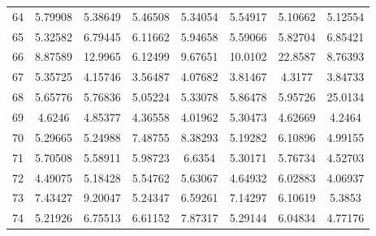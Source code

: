 \begin{center}
\begin{longtable}{cccccccc}
64 & 5.79908 & 5.38649 & 5.46508 & 5.34054 & 5.54917 & 5.10662 & 5.12554\\
65 & 5.32582 & 6.79445 & 6.11662 & 5.94658 & 5.59066 & 5.82704 & 6.85421\\
66 & 8.87589 & 12.9965 & 6.12499 & 9.67651 & 10.0102 & 22.8587 & 8.76393\\
67 & 5.35725 & 4.15746 & 3.56487 & 4.07682 & 3.81467 & 4.3177 & 3.84733\\
68 & 5.65776 & 5.76836 & 5.05224 & 5.33078 & 5.86478 & 5.95726 & 25.0134\\
69 & 4.6246 & 4.85377 & 4.36558 & 4.01962 & 5.30473 & 4.62669 & 4.2464\\
70 & 5.29665 & 5.24988 & 7.48755 & 8.38293 & 5.19282 & 6.10896 & 4.99155\\
71 & 5.70508 & 5.58911 & 5.98723 & 6.6354 & 5.30171 & 5.76734 & 4.52703\\
72 & 4.49075 & 5.18428 & 5.54762 & 5.63067 & 4.64932 & 6.02883 & 4.06937\\
73 & 7.43427 & 9.20047 & 5.24347 & 6.59261 & 7.14297 & 6.10619 & 5.3853\\
74 & 5.21926 & 6.75513 & 6.61152 & 7.87317 & 5.29144 & 6.04834 & 4.77176\\
\end{longtable}
\end{center} 




